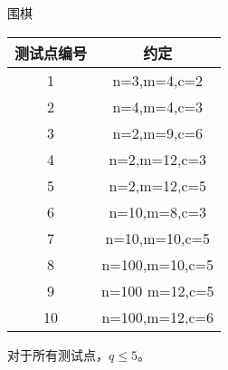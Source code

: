 \begin{problem}{围棋}
\Note
\begin{center}
\begin{tabular}{c|c}
\hline
\textsf{测试点编号}&\textsf{约定}\\
\hline
1	&n=3,m=4,c=2\\
\hline
2	&n=4,m=4,c=3\\
\hline
3	&n=2,m=9,c=6\\
\hline
4	&n=2,m=12,c=3\\
\hline
5	&n=2,m=12,c=5\\
\hline
6	&n=10,m=8,c=3\\
\hline
7	&n=10,m=10,c=5\\
\hline
8	&n=100,m=10,c=5\\
\hline
9	&n=100 m=12,c=5\\
\hline
10	&n=100,m=12,c=6\\
\hline
\end{tabular}
\end{center}
对于所有测试点，$q\le 5$。
\end{problem}
